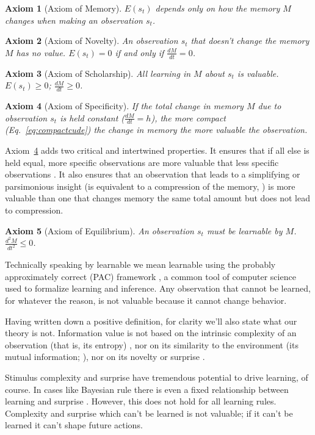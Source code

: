 \documentclass[12pt]{article}
\newtheorem{axiom}{Axiom}
\begin{document}
\begin{axiom}
	[Axiom of Memory] $E(s_t)$ depends \emph{only} on how the memory $M$ changes when making an observation $s_t$. 
\label{ax:1} \end{axiom}
\begin{axiom}
	[Axiom of Novelty] An observation $s_t$ that doesn't change the memory $M$ has no value. $E(s_t) = 0$ if and only if $\frac{dM}{dt} = 0$. 
\label{ax:2} \end{axiom}
\begin{axiom}
	[Axiom of Scholarship] All learning in $M$ about $s_t$ is valuable. $E(s_t) \geq 0$; $\frac{dM}{dt} \geq 0$. 
\label{ax:3} \end{axiom}
\begin{axiom}
    [Axiom of Specificity] If the total change in memory $M$ due to observation $s_t$ is held constant ($\frac{dM}{dt} = h$), the more compact (Eq.~\ref{eq:compactcude}) the change in memory the more valuable the observation. 
\label{ax:4} \end{axiom}
\noindent Axiom~\ref{ax:4} adds two critical and intertwined properties. It ensures that if all else is held equal, more specific observations are more valuable that less specific observations \cite{Berlyne1950,Kidd2015}. It also ensures that an observation that leads to a simplifying or parsimonious insight (is equivalent to a compression of the memory, \cite{Schmidhuber2008}) is more valuable than one that changes memory the same total amount but does not lead to compression.
\begin{axiom}
	[Axiom of Equilibrium] An observation $s_t$ must be learnable by $M$. $\frac{d^2M}{dt^2} \leq 0$. 
\label{ax:5} \end{axiom}
\noindent Technically speaking by learnable we mean learnable using the probably approximately correct (PAC) framework \cite{Valiant1984}, a common tool of computer science used to formalize learning and inference. Any observation that cannot be learned, for whatever the reason, is not valuable because it cannot change behavior.

Having written down a positive definition, for clarity we'll also state what our theory is not. Information value is not based on the intrinsic complexity of an observation (that is, its entropy) \cite{Haarnoja2018}, nor on its similarity to the environment (its mutual information; \cite{Kolchinsky2018}), nor on its novelty or surprise \cite{Itti2009,Friston2016,Dayan1996}. 

Stimulus complexity and surprise have tremendous potential to drive learning, of course. In cases like Bayesian rule there is even a fixed relationship between learning and surprise \cite{Itti2009,Friston2016,MacKay2003}. However, this does not hold for all learning rules. Complexity and surprise which can't be learned is not valuable; if it can't be learned it can't shape future actions. 
\end{document}
